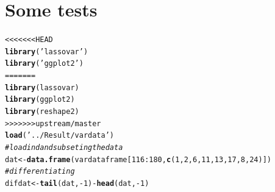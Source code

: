 \documentclass[11pt,oneside, a4paper]{amsart}\usepackage[]{graphicx}\usepackage[]{color}
\makeatletter
\newcommand{\hlnum}[1]{\textcolor[rgb]{0.686,0.059,0.569}{#1}}%
\newcommand{\hlstr}[1]{\textcolor[rgb]{0.192,0.494,0.8}{#1}}%
\newcommand{\hlcom}[1]{\textcolor[rgb]{0.678,0.584,0.686}{\textit{#1}}}%
\newcommand{\hlopt}[1]{\textcolor[rgb]{0,0,0}{#1}}%
\newcommand{\hlstd}[1]{\textcolor[rgb]{0.345,0.345,0.345}{#1}}%
\newcommand{\hlkwb}[1]{\textcolor[rgb]{0.69,0.353,0.396}{#1}}%
\newcommand{\hlkwd}[1]{\textcolor[rgb]{0.737,0.353,0.396}{\textbf{#1}}}%
\newenvironment{kframe}{%
 \def\at@end@of@kframe{}%
 \ifinner\ifhmode%
  \def\at@end@of@kframe{\end{minipage}}%
  \begin{minipage}{\columnwidth}%
 \fi\fi%
 \def\FrameCommand##1{\hskip\@totalleftmargin \hskip-\fboxsep
 \colorbox{shadecolor}{##1}\hskip-\fboxsep
     \hskip-\linewidth \hskip-\@totalleftmargin \hskip\columnwidth}%
 \MakeFramed {\advance\hsize-\width
   \@totalleftmargin\z@ \linewidth\hsize
   \@setminipage}}%
 {\par\unskip\endMakeFramed%
 \at@end@of@kframe}
\newenvironment{knitrout}{}{} %
\makeatother
\begin{document}
\section*{Some tests}


\begin{knitrout}
\color{fgcolor}\begin{kframe}
\begin{alltt}
<<<<<<< HEAD
\hlkwd{library}\hlstd{(}\hlstr{'lassovar'}\hlstd{)}
\hlkwd{library}\hlstd{(}\hlstr{'ggplot2'}\hlstd{)}
=======
\hlkwd{library}\hlstd{(lassovar)}
\hlkwd{library}\hlstd{(ggplot2)}
\hlkwd{library}\hlstd{(reshape2)}
>>>>>>> upstream/master
\hlkwd{load}\hlstd{(}\hlstr{'../Result/vardata'}\hlstd{)}
\hlcom{# loadind and subseting the data}
\hlstd{dat} \hlkwb{<-} \hlkwd{data.frame}\hlstd{(vardataframe[}\hlnum{116}\hlopt{:}\hlnum{180}\hlstd{,} \hlkwd{c}\hlstd{(}\hlnum{1}\hlstd{,}\hlnum{2}\hlstd{,}\hlnum{6}\hlstd{,}\hlnum{11}\hlstd{,}\hlnum{13}\hlstd{,}\hlnum{17}\hlstd{,}\hlnum{8}\hlstd{,}\hlnum{24}\hlstd{) ])}
\hlcom{# differentiating}
\hlstd{difdat} \hlkwb{<-} \hlkwd{tail}\hlstd{(dat,}\hlopt{-}\hlnum{1}\hlstd{)} \hlopt{-} \hlkwd{head}\hlstd{(dat,}\hlopt{-}\hlnum{1}\hlstd{)}
\end{alltt}
\end{kframe}
\end{knitrout}
\end{document}
